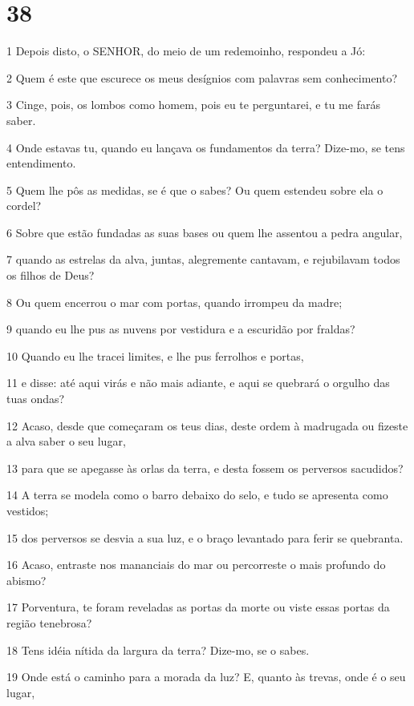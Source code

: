 \chapter{38}

\par 1 Depois disto, o SENHOR, do meio de um redemoinho, respondeu a Jó:
\par 2 Quem é este que escurece os meus desígnios com palavras sem conhecimento?
\par 3 Cinge, pois, os lombos como homem, pois eu te perguntarei, e tu me farás saber.
\par 4 Onde estavas tu, quando eu lançava os fundamentos da terra? Dize-mo, se tens entendimento.
\par 5 Quem lhe pôs as medidas, se é que o sabes? Ou quem estendeu sobre ela o cordel?
\par 6 Sobre que estão fundadas as suas bases ou quem lhe assentou a pedra angular,
\par 7 quando as estrelas da alva, juntas, alegremente cantavam, e rejubilavam todos os filhos de Deus?
\par 8 Ou quem encerrou o mar com portas, quando irrompeu da madre;
\par 9 quando eu lhe pus as nuvens por vestidura e a escuridão por fraldas?
\par 10 Quando eu lhe tracei limites, e lhe pus ferrolhos e portas,
\par 11 e disse: até aqui virás e não mais adiante, e aqui se quebrará o orgulho das tuas ondas?
\par 12 Acaso, desde que começaram os teus dias, deste ordem à madrugada ou fizeste a alva saber o seu lugar,
\par 13 para que se apegasse às orlas da terra, e desta fossem os perversos sacudidos?
\par 14 A terra se modela como o barro debaixo do selo, e tudo se apresenta como vestidos;
\par 15 dos perversos se desvia a sua luz, e o braço levantado para ferir se quebranta.
\par 16 Acaso, entraste nos mananciais do mar ou percorreste o mais profundo do abismo?
\par 17 Porventura, te foram reveladas as portas da morte ou viste essas portas da região tenebrosa?
\par 18 Tens idéia nítida da largura da terra? Dize-mo, se o sabes.
\par 19 Onde está o caminho para a morada da luz? E, quanto às trevas, onde é o seu lugar,
